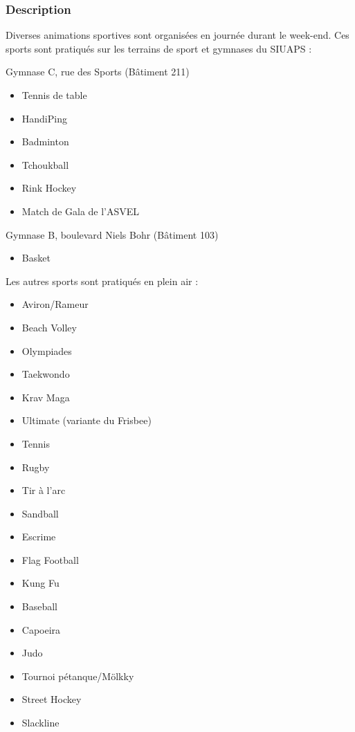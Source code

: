 \documentclass[hidelinks, paper=a4, fontsize=13pt]{report}
\begin{document}
\subsubsection{Description}

Diverses animations sportives sont organisées en journée durant le week-end. Ces sports sont pratiqués sur les terrains de sport et gymnases du SIUAPS :


Gymnase C, rue des Sports (Bâtiment 211)
\begin{itemize}
\item Tennis de table
\item HandiPing
\item Badminton
\item Tchoukball
\item Rink Hockey
\item Match de Gala de l'ASVEL
\end{itemize}

Gymnase B, boulevard Niels Bohr (Bâtiment 103)
\begin{itemize}
\item Basket
\end{itemize}



Les autres sports sont pratiqués en plein air :
\begin{itemize}
\item Aviron/Rameur
\item Beach Volley
\item Olympiades
\item Taekwondo
\item Krav Maga
\item Ultimate (variante du Frisbee)
\item Tennis
\item Rugby
\item Tir à l’arc
\item Sandball
\item Escrime
\item Flag Football
\item Kung Fu
\item Baseball
\item Capoeira
\item Judo
\item Tournoi pétanque/Mölkky
\item Street Hockey
\item Slackline
\end{itemize}
\end{document}
